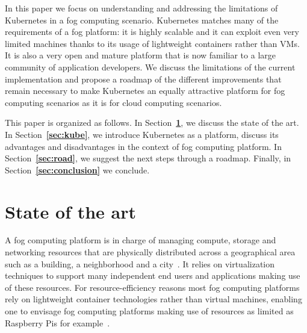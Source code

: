 \documentclass[letterpaper,twocolumn,10pt]{article}
\let\origref\ref
\def\ref#1{\textbf{\origref{#1}}}
\begin{document}
In this paper we focus on understanding and addressing the limitations
of Kubernetes in a fog computing scenario. Kubernetes matches many of
the requirements of a fog platform: it is highly scalable and it
can exploit even very limited machines thanks to its usage of
lightweight containers rather than VMs. It is also a very open and
mature platform that is now familiar to a large community of
application developers. We discuss the limitations of the current
implementation and propose a roadmap of the different improvements
that remain necessary to make Kubernetes an equally attractive
platform for fog computing scenarios as it is for cloud computing
scenarios.




This paper is organized as follows. In Section~\ref{sec:plat}, we
discuss the state of the art. In Section~\ref{sec:kube}, we introduce
Kubernetes as a platform, discuss its advantages and disadvantages in
the context of fog computing platform. In Section~\ref{sec:road}, we
suggest the next steps through a roadmap. Finally, in
Section~\ref{sec:conclusion} we conclude.


\section{State of the art}\label{sec:plat}

A fog computing platform is in charge of managing compute, storage and
networking resources that are physically distributed across a
geographical area such as a building, a neighborhood and a
city~\cite{bonomi2014, fogecosystem}. It relies on virtualization
techniques to support many independent end users and applications
making use of these resources. For resource-efficiency reasons most
fog computing platforms rely on lightweight container technologies
rather than virtual machines, enabling one to envisage fog computing
platforms making use of resources as limited as Raspberry Pis for
example~\cite{vankempen:hal-01446483}.
\end{document}
